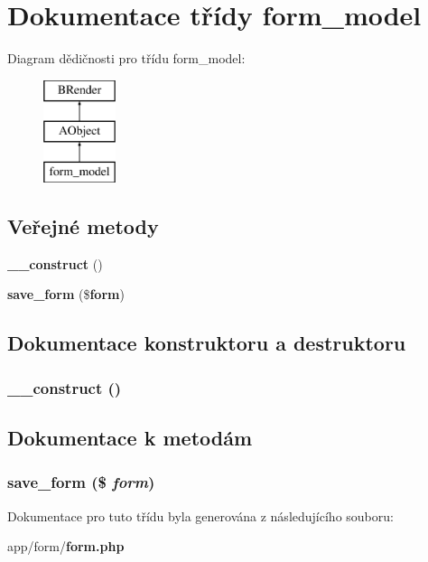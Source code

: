 \section{Dokumentace třídy form\_\-model}
\label{d0/d17/classform__model}
Diagram dědičnosti pro třídu form\_\-model:\begin{figure}[H]
\begin{center}
\leavevmode
\includegraphics[height=3cm]{d0/d17/classform__model}
\end{center}
\end{figure}
\subsection*{Veřejné metody}
\begin{DoxyCompactItemize}
\item 
{\bf \_\-\_\-construct} ()
\item 
{\bf save\_\-form} (\${\bf form})
\end{DoxyCompactItemize}


\subsection{Dokumentace konstruktoru a destruktoru}
\subsubsection[{\_\-\_\-construct}]{\setlength{\rightskip}{0pt plus 5cm}\_\-\_\-construct ()}\label{d0/d17/classform__model_a095c5d389db211932136b53f25f39685}


\subsection{Dokumentace k metodám}
\subsubsection[{save\_\-form}]{\setlength{\rightskip}{0pt plus 5cm}save\_\-form (\$ {\em form})}\label{d0/d17/classform__model_a1ad6d2b6b59c22e55cdca832f3dc5946}


Dokumentace pro tuto třídu byla generována z následujícího souboru:\begin{DoxyCompactItemize}
\item 
app/form/{\bf form.php}\end{DoxyCompactItemize}
